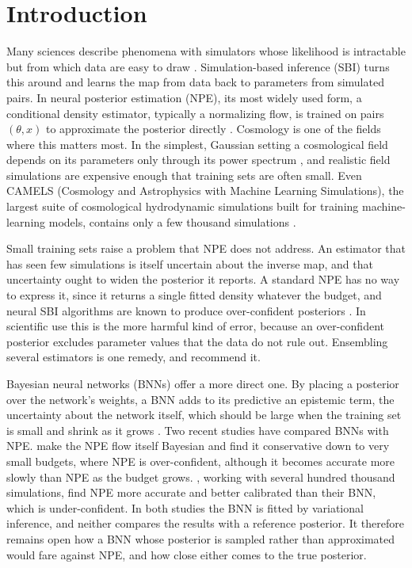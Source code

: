 \documentclass[11pt]{article}
\begin{document}
\tableofcontents

\section{Introduction}
\label{sec:intro}
Many sciences describe phenomena with simulators whose likelihood is intractable but from which data are easy to draw
\citep{cranmer2020frontier}. Simulation-based inference (SBI) turns this around and learns the map from data back to
parameters from simulated pairs. In neural posterior estimation (NPE), its most widely used form, a conditional density
estimator, typically a normalizing flow, is trained on pairs $(\theta,x)$ to approximate the posterior directly
\citep{papamakarios2016fast,papamakarios2017maf}. Cosmology is one of the fields where this matters most. In the
simplest, Gaussian setting a cosmological field depends on its parameters only through its power spectrum
\citep{makinen2021lossless}, and realistic field simulations are expensive enough that training sets are often small.
Even CAMELS (Cosmology and Astrophysics with Machine Learning Simulations), the largest suite of cosmological
hydrodynamic simulations built for training machine-learning models, contains only a few thousand simulations
\citep{villaescusa2021camels}.

Small training sets raise a problem that NPE does not address. An estimator that has seen few simulations is itself
uncertain about the inverse map, and that uncertainty ought to widen the posterior it reports. A standard NPE has no
way to express it, since it returns a single fitted density whatever the budget, and neural SBI algorithms are known to
produce over-confident posteriors \citep{hermans2022trust}. In scientific use this is the more harmful kind of error,
because an over-confident posterior excludes parameter values that the data do not rule out. Ensembling several
estimators is one remedy, and \citet{hermans2022trust} recommend it.

Bayesian neural networks (BNNs) offer a more direct one. By placing a posterior over the network's weights, a BNN adds
to its predictive an epistemic term, the uncertainty about the network itself, which should be large when the training
set is small and shrink as it grows \citep{kendall2017uncertainties}. Two recent studies have compared BNNs with NPE.
\citet{delaunoy2024lowbudget} make the NPE flow itself Bayesian and find it conservative down to very small budgets,
where NPE is over-confident, although it becomes accurate more slowly than NPE as the budget grows.
\citet{poh2025lensing}, working with several hundred thousand simulations, find NPE more accurate and better calibrated
than their BNN, which is under-confident. In both studies the BNN is fitted by variational inference, and neither
compares the results with a reference posterior. It therefore remains open how a BNN whose posterior is sampled rather
than approximated would fare against NPE, and how close either comes to the true posterior.
\end{document}
